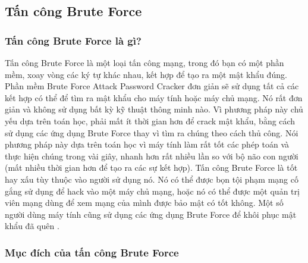 \subsection{Tấn công Brute Force}
\subsubsection{Tấn công Brute Force là gì?}
Tấn công Brute Force là một loại tấn công mạng, trong đó bạn có một phần mềm, xoay vòng các ký tự khác nhau, kết hợp để tạo ra một mật khẩu đúng. Phần mềm Brute Force Attack Password Cracker đơn giản sẽ sử dụng tất cả các kết hợp có thể để tìm ra mật khẩu cho máy tính hoặc máy chủ mạng. Nó rất đơn giản và không sử dụng bất kỳ kỹ thuật thông minh nào. Vì phương pháp này chủ yếu dựa trên toán học, phải mất ít thời gian hơn để crack mật khẩu, bằng cách sử dụng các ứng dụng Brute Force thay vì tìm ra chúng theo cách thủ công. Nói phương pháp này dựa trên toán học vì máy tính làm rất tốt các phép toán và thực hiện chúng trong vài giây, nhanh hơn rất nhiều lần so với bộ não con người (mất nhiều thời gian hơn để tạo ra các sự kết hợp). Tấn công Brute Force là tốt hay xấu tùy thuộc vào người sử dụng nó. Nó có thể được bọn tội phạm mạng cố gắng sử dụng để hack vào một máy chủ mạng, hoặc nó có thể được một quản trị viên mạng dùng để xem mạng của mình được bảo mật có tốt không. Một số người dùng máy tính cũng sử dụng các ứng dụng Brute Force để khôi phục mật khẩu đã quên \cite{hofstede2017flow}.

\subsubsection{ Mục đích của tấn công Brute Force}

